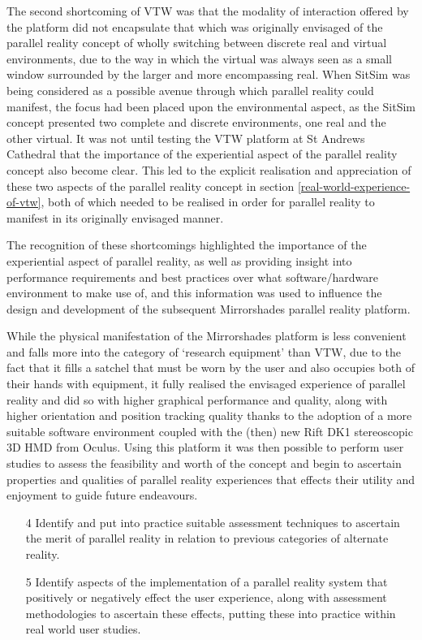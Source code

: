The second shortcoming of VTW was that the modality of interaction offered by the platform did not encapsulate that which was originally envisaged of the parallel reality concept of wholly switching between discrete real and virtual environments, due to the way in which the virtual was always seen as a small window surrounded by the larger and more encompassing real. When SitSim was being considered as a possible avenue through which parallel reality could manifest, the focus had been placed upon the environmental aspect, as the SitSim concept presented two complete and discrete environments, one real and the other virtual. It was not until testing the VTW platform at St Andrews Cathedral that the importance of the experiential aspect of the parallel reality concept also become clear. This led to the explicit realisation and appreciation of these two aspects of the parallel reality concept in section \ref{real-world-experience-of-vtw}, both of which needed to be realised in order for parallel reality to manifest in its originally envisaged manner.

The recognition of these shortcomings highlighted the importance of the experiential aspect of parallel reality, as well as providing insight into performance requirements and best practices over what software/hardware environment to make use of, and this information was used to influence the design and development of the subsequent Mirrorshades parallel reality platform.

While the physical manifestation of the Mirrorshades platform is less convenient and falls more into the category of `research equipment' than VTW, due to the fact that it fills a satchel that must be worn by the user and also occupies both of their hands with equipment, it fully realised the envisaged experience of parallel reality and did so with higher graphical performance and quality, along with higher orientation and position tracking quality thanks to the adoption of a more suitable software environment coupled with the (then) new Rift DK1 stereoscopic 3D HMD from Oculus. Using this platform it was then possible to perform user studies to assess the feasibility and worth of the concept and begin to ascertain properties and qualities of parallel reality experiences that effects their utility and enjoyment to guide future endeavours.

\begin{enumerate}	
	\item[4] Identify and put into practice suitable assessment techniques to ascertain the merit of parallel reality in relation to previous categories of alternate reality.
	\item[5] Identify aspects of the implementation of a parallel reality system that positively or negatively effect the user experience, along with assessment methodologies to ascertain these effects, putting these into practice within real world user studies.
\end{enumerate}

